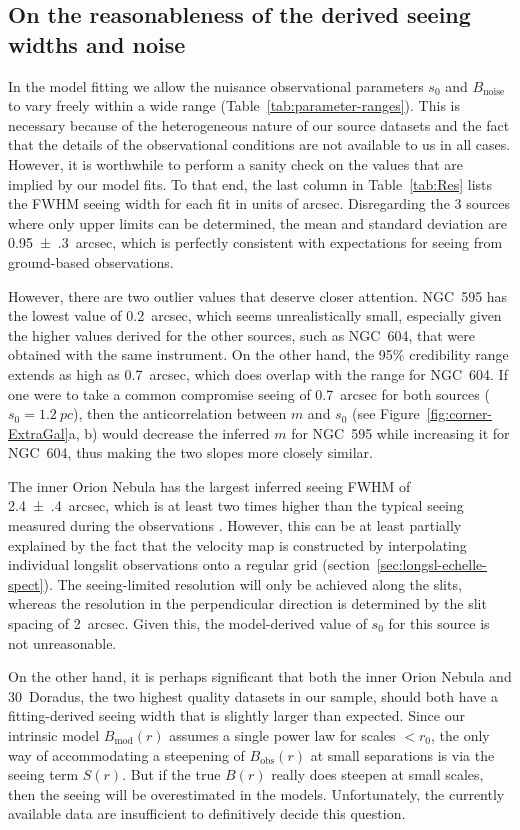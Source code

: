 \documentclass[fleqn,usenatbib, useAMS, a4paper]{mnras}
\newcommand\noise{\ensuremath{_{\text{noise}}}}
\newcommand\obs{\ensuremath{_{\mathrm{obs}}}}
\newcommand\model{\ensuremath{_{\mathrm{mod}}}}
\begin{document}
\subsection{On the reasonableness of the derived seeing widths and noise}
\label{sec:sanity-check-derived}
In the model fitting we allow the nuisance observational parameters
\(s_0\) and \(B\noise\) to vary freely within a wide range
(Table~\ref{tab:parameter-ranges}).
This is necessary because of the heterogeneous nature of our source datasets
and the fact that the details of the observational conditions
are not available to us in all cases.
However, it is worthwhile to perform a sanity check on the values that are implied by our model fits.
To that end, the last column in Table~\ref{tab:Res} lists the FWHM seeing width for each fit in units of arcsec.
Disregarding the 3 sources where only upper limits can be determined,
the mean and standard deviation are \SI{0.95(30)}{arcsec},
which is perfectly consistent with expectations for seeing from ground-based observations.

However, there are two outlier values that deserve closer attention.
NGC~595 has the lowest value of \SI{0.2}{arcsec}, which seems
unrealistically small, especially given the higher values
derived for the other sources, such as NGC~604,
that were obtained with the same instrument.
On the other hand, the 95\% credibility range extends as high as \SI{0.7}{arcsec},
which does overlap with the range for NGC~604.
If one were to take a common compromise seeing of \SI{0.7}{arcsec}
for both sources (\(s_0 = \SI{1.2}{pc}\)),
then the anticorrelation between \(m\) and \(s_0\)
(see Figure~\ref{fig:corner-ExtraGal}a, b)
would decrease the inferred \(m\) for NGC~595 while increasing it for NGC~604,
thus making the two slopes more closely similar. 

The inner Orion Nebula has the largest inferred seeing FWHM of \SI{2.4(4)}{arcsec},
which is at least two times higher than the typical seeing measured during the observations
\citep{Doi:2004a}.
However, this can be at least partially explained by the fact that the velocity map is constructed
by interpolating individual longslit observations onto a regular grid
(section~\ref{sec:longsl-echelle-spect}).
The seeing-limited resolution will only be achieved along the slits,
whereas the resolution in the perpendicular direction is determined by the slit spacing of \SI{2}{arcsec}.
Given this, the model-derived value of \(s_0\) for this source is not unreasonable.

On the other hand, it is perhaps significant that both
the inner Orion Nebula and 30~Doradus,
the two highest quality datasets in our sample,
should both have a fitting-derived seeing width that is
slightly larger than expected.
Since our intrinsic model \(B\model(r)\) assumes a single power law
for scales \(<r_0\),
the only way of accommodating a steepening of \(B\obs(r)\) at small separations
is via the seeing term \(S(r)\).
But if the true \(B(r)\) really does steepen at small scales,
then the seeing will be overestimated in the models.
Unfortunately, the currently available data are insufficient to
definitively decide this question.
\end{document}
